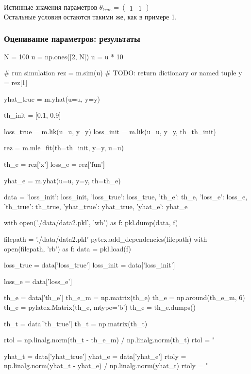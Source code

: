 \documentclass[a4paper,14pt]{extarticle}
\begin{document}
Истинные значения параметров
$\theta_{true} = \begin{pmatrix} 1 & 1 \end{pmatrix}$ \\

Остальные условия остаются такими же, как в примере 1.

\subsubsection{Оценивание параметров: результаты}

\begin{pycode}[model2]
N = 100
u = np.ones([2, N])
u = u * 10

# run simulation
rez = m.sim(u)  # TODO: return dictionary or named tuple
y = rez[1]

yhat_true = m.yhat(u=u, y=y)

th_init = [0.1, 0.9]

loss_true = m.lik(u=u, y=y)
loss_init = m.lik(u=u, y=y, th=th_init)

rez = m.mle_fit(th=th_init, y=y, u=u)

th_e = rez['x']
loss_e = rez['fun']

yhat_e = m.yhat(u=u, y=y, th=th_e)

data = {'loss_init': loss_init,
        'loss_true': loss_true,
        'th_e': th_e,
        'loss_e': loss_e,
        'th_true': th_true,
        'yhat_true': yhat_true,
        'yhat_e': yhat_e}

with open('./data/data2.pkl', 'wb') as f:
    pkl.dump(data, f)
\end{pycode}

\begin{pycode}
filepath = './data/data2.pkl'
pytex.add_dependencies(filepath)
with open(filepath, 'rb') as f:
  data = pkl.load(f)

loss_true = data['loss_true']
loss_init = data['loss_init']

loss_e = data['loss_e']

th_e = data['th_e']
th_e_m = np.matrix(th_e)
th_e = np.around(th_e_m, 6)
th_e = pylatex.Matrix(th_e, mtype='b')
th_e = th_e.dumps()

th_t = data['th_true']
th_t = np.matrix(th_t)

rtol = np.linalg.norm(th_t - th_e_m) / np.linalg.norm(th_t)
rtol = "%

yhat_t = data['yhat_true']
yhat_e = data['yhat_e']
rtoly = np.linalg.norm(yhat_t - yhat_e) / np.linalg.norm(yhat_t)
rtoly = "%
\end{pycode}
\end{document}
